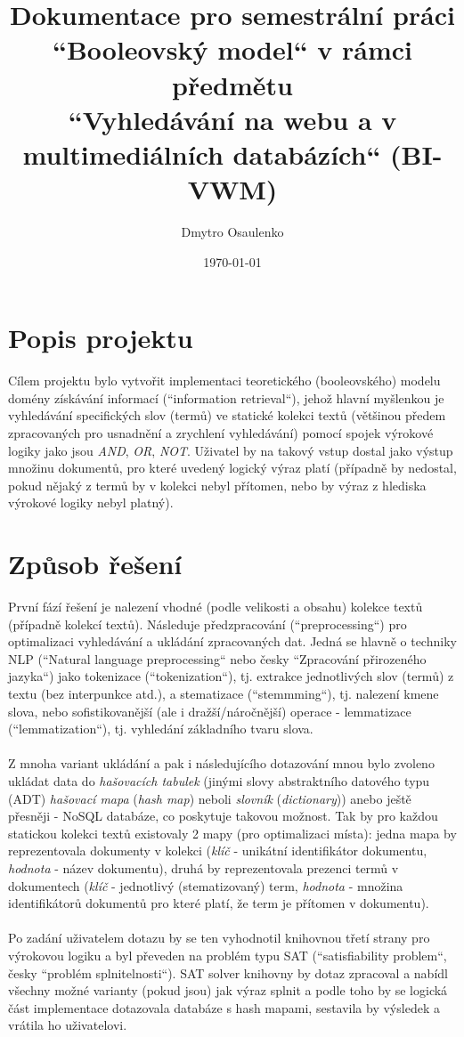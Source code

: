 \documentclass[a4paper,titlepage]{article}
\title{Dokumentace pro semestrální práci \protect\\ ``Booleovský model``
v rámci předmětu \protect\\``Vyhledávání na webu a v multimediálních databázích`` (BI-VWM)}
\author{Dmytro Osaulenko}
\date{\selectlanguage{czech}\today}
\begin{document}
\maketitle

\section*{Popis projektu}

Cílem projektu bylo vytvořit implementaci teoretického (booleovského) modelu
domény získávání informací (``information retrieval``), jehož hlavní myšlenkou je vyhledávání
specifických slov (termů) ve statické kolekci textů (většinou předem zpracovaných pro usnadnění
a zrychlení vyhledávání) pomocí spojek výrokové logiky jako jsou \emph{AND}, \emph{OR}, \emph{NOT}.
Uživatel by na takový vstup dostal jako výstup množinu dokumentů, pro které uvedený logický výraz
platí (případně by nedostal, pokud nějaký z termů by v kolekci nebyl přítomen, nebo by výraz z hlediska
výrokové logiky nebyl platný).

\section*{Způsob řešení}

První fází řešení je nalezení vhodné (podle velikosti a obsahu) kolekce textů (případně kolekcí textů).
Následuje předzpracování (``preprocessing``) pro optimalizaci vyhledávání a ukládání zpracovaných dat.
Jedná se hlavně o techniky NLP (``Natural language preprocessing`` nebo česky ``Zpracování přirozeného jazyka``)
jako tokenizace (``tokenization``), tj. extrakce jednotlivých slov (termů) z textu (bez interpunkce atd.),
a stematizace (``stemmming``), tj. nalezení kmene slova, nebo sofistikovanější (ale i dražší/náročnější)
operace - lemmatizace (``lemmatization``), tj. vyhledání základního tvaru slova.
\\~\\
Z mnoha variant ukládání a pak i následujícího dotazování mnou bylo zvoleno ukládat data do
\emph{hašovacích tabulek} (jinými slovy abstraktního datového typu (ADT) \emph{hašovací mapa}
(\emph{hash map}) neboli \emph{slovník} (\emph{dictionary})) anebo ještě přesněji - NoSQL databáze,
co poskytuje takovou možnost. Tak by pro každou statickou kolekci textů existovaly 2 mapy
(pro optimalizaci místa): jedna mapa by reprezentovala dokumenty v kolekci (\emph{klíč} - unikátní
identifikátor dokumentu, \emph{hodnota} - název dokumentu), druhá by reprezentovala prezenci
termů v dokumentech (\emph{klíč} - jednotlivý (stematizovaný) term, \emph{hodnota} - množina
identifikátorů dokumentů pro které platí, že term je přítomen v dokumentu).
\\~\\
Po zadání uživatelem dotazu by se ten vyhodnotil knihovnou třetí strany pro výrokovou logiku
a byl převeden na problém typu SAT (``satisfiability problem``, česky ``problém splnitelnosti``).
SAT solver knihovny by dotaz zpracoval a nabídl všechny možné varianty (pokud jsou) jak výraz
splnit a podle toho by se logická část implementace dotazovala databáze s hash mapami, sestavila by
výsledek a vrátila ho uživatelovi.
\end{document}
